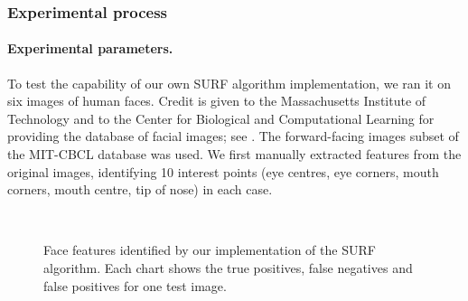 \subsubsection{Experimental process}

\paragraph{Experimental parameters.}
To test the capability of our own SURF algorithm implementation, we ran it on six images of human faces. Credit is given to the Massachusetts Institute of Technology and to the Center for Biological and Computational Learning for providing the database of facial images; see \cite{database}. The forward-facing images subset of the MIT-CBCL database was used. We first manually extracted features from the original images, identifying 10 interest points (eye centres, eye corners, mouth corners, mouth centre, tip of nose) in each case.

\begin{figure} [h]
  \centering
  \\
  \caption[Face features identified by our SURF implementation (images 1 \& 2)]{Face features identified by our implementation of the SURF algorithm. Each chart shows the true positives, false negatives and false positives for one test image.}
  \label{fig:face-features-hits-1}
\end{figure}

